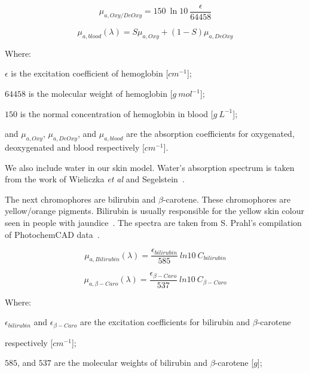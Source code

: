 \begin{equation}
\mu_{a,Oxy/DeOxy}=150\ \ln10\ \frac{\epsilon}{64458}
\label{eqn:oxy}
\end{equation}

\begin{equation}
\mu_{a,blood}(\lambda) = S\mu_{a,Oxy}+(1-S)\mu_{a,DeOxy}
\label{eqn:blood}
\end{equation}

\noindent Where:

\indent $\epsilon$ is the excitation coefficient of hemoglobin [$cm^{-1}$];

\indent $64458$ is the molecular weight of hemoglobin [$g\ mol^{-1}$];

\indent $150$ is the normal concentration of hemoglobin in blood [$g\ L^{-1}$];

\indent and $\mu_{a,Oxy}$, $\mu_{a,DeOxy}$, and $\mu_{a,blood}$ are the absorption coefficients for oxygenated, deoxygenated and blood respectively [$cm^{-1}$].

\medskip

We also include water in our skin model.
Water's absorption spectrum is taken from the work of Wieliczka \textit{et al} and Segelstein~\cite{wieliczka1989wedge,segelstein1981complex}.

The next chromophores are bilirubin and $\beta$-carotene.
These chromophores are yellow/orange pigments. 
Bilirubin is usually responsible for the yellow skin colour seen in people with jaundice~\cite{jacques1997developing}.
The spectra are taken from S. Prahl's compilation of PhotochemCAD data~\cite{prahlcaro,prahlbili}.

\begin{equation}
\mu_{a,Bilirubin}(\lambda)=\frac{\epsilon_{bilirubin}}{585}\ ln10\ C_{bilirubin}
\label{eqn:bili}
\end{equation}

\begin{equation}
\mu_{a,\beta-Caro}(\lambda)=\frac{\epsilon_{\beta-Caro}}{537}\ ln10\ C_{\beta-Caro}
\label{eqn:caro}
\end{equation}

\noindent Where:

\indent $\epsilon_{bilirubin}$ and $\epsilon_{\beta-Caro}$ are the excitation coefficients for bilirubin and $\beta$-carotene 

\indent respectively [$cm^{-1}$];

\indent $585$, and $537$ are the molecular weights of bilirubin and $\beta$-carotene [$g$];

